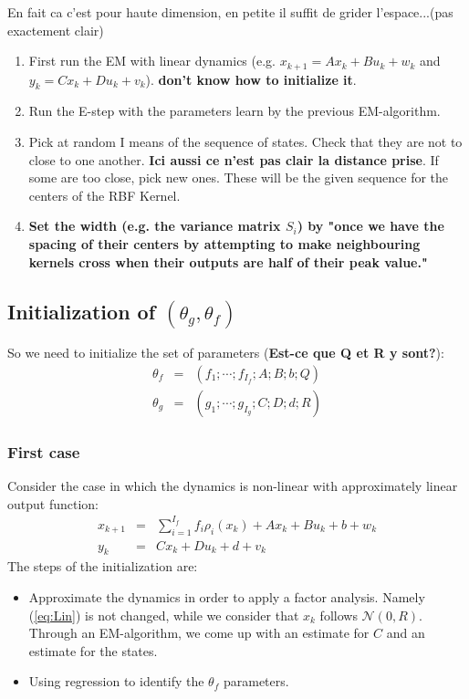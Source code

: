 En fait ca c'est pour haute dimension, en petite il suffit de grider l'espace...(pas exactement clair)
\begin{enumerate}
\item First run the EM with linear dynamics (e.g. $x_{k+1}=Ax_k+B u_k +w_k$ and $y_k=C x_k + D u_k +v_k$). \textbf{don't know how to initialize it}.
\item Run the E-step with the parameters learn by the previous EM-algorithm.
\item Pick at random I means of the sequence of states. Check that they are not to close to one another. \textbf{Ici aussi ce n'est pas clair la distance prise}. If some are too close, pick new ones. These will be the given sequence for the centers of the RBF Kernel.
\item \textbf{Set the width (e.g. the variance matrix $S_i$) by "once we have the spacing of their centers by attempting to make neighbouring kernels cross when their outputs are half of their peak value."}
\end{enumerate}

\subsection{Initialization of $(\theta_g,\theta_f)$}
So we need to initialize the set of parameters (\textbf{Est-ce que Q et R y sont?}):
\begin{eqnarray*}
\theta_f &=& (f_1;\cdots;f_{I_f};A;B;b;Q)\\
\theta_g &=& (g_1;\cdots;g_{I_g};C;D;d;R)
\end{eqnarray*}

\subsubsection{First case}
Consider the case in which the dynamics is non-linear with approximately linear output function:
\begin{eqnarray}
x_{k+1} &=& \sum_{i=1}^{I_f}{f_i\rho_i(x_k)}+Ax_k+Bu_k+b+w_k\\\label{eq:caca}
y_{k} &=& Cx_k+Du_k+d+v_k\label{eq:Lin}
\end{eqnarray}
The steps of the initialization are:
\begin{itemize}
\item Approximate the dynamics in order to apply a factor analysis. Namely (\ref{eq:Lin}) is not changed, while we consider that $x_k$ follows $\mathcal{N}(0,R)$. Through an EM-algorithm, we come up with an estimate for $C$ and an estimate for the states.
\item Using regression to identify the $\theta_f$ parameters. 
\end{itemize}

